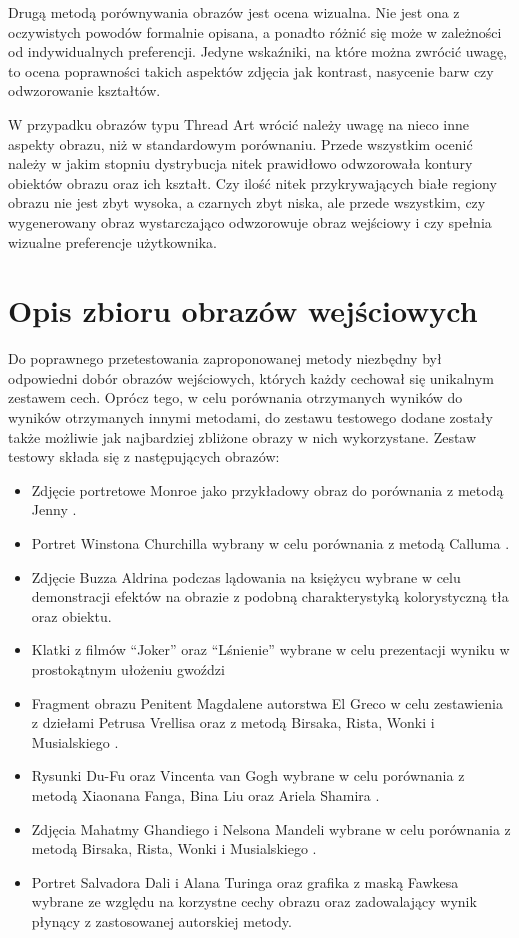     Drugą metodą porównywania obrazów jest ocena wizualna. Nie jest ona z oczywistych powodów formalnie opisana, a ponadto różnić się może w zależności od indywidualnych preferencji. Jedyne wskaźniki, na które można zwrócić uwagę, to ocena poprawności takich aspektów zdjęcia jak kontrast, nasycenie barw czy odwzorowanie kształtów.
    
    W przypadku obrazów typu Thread Art wrócić należy uwagę na nieco inne aspekty obrazu, niż w standardowym porównaniu. Przede wszystkim ocenić należy w jakim stopniu dystrybucja nitek prawidłowo odwzorowała kontury obiektów obrazu oraz ich kształt. Czy ilość nitek przykrywających białe regiony obrazu nie jest zbyt wysoka, a czarnych zbyt niska, ale przede wszystkim, czy wygenerowany obraz wystarczająco odwzorowuje obraz wejściowy i czy spełnia wizualne preferencje użytkownika.
    
    \section{Opis zbioru obrazów wejściowych} \label{comp-dataset}
    Do poprawnego przetestowania zaproponowanej metody niezbędny był odpowiedni dobór obrazów wejściowych, których każdy cechował się unikalnym zestawem cech. Oprócz tego, w celu porównania otrzymanych wyników do wyników otrzymanych innymi metodami, do zestawu testowego dodane zostały także możliwie jak najbardziej zbliżone obrazy w nich wykorzystane. Zestaw testowy składa się z następujących obrazów:
    \begin{itemize}
        \item Zdjęcie portretowe Monroe jako przykładowy obraz do porównania z metodą Jenny \cite{jenny-github}.
        \item Portret Winstona Churchilla wybrany w celu porównania z metodą Calluma \cite{callum-github}.
        \item Zdjęcie Buzza Aldrina podczas lądowania na księżycu wybrane w celu demonstracji efektów na obrazie z podobną charakterystyką kolorystyczną tła oraz obiektu.
        \item Klatki z filmów ``Joker'' oraz ``Lśnienie'' wybrane w celu prezentacji wyniku w prostokątnym ułożeniu gwoździ
        \item Fragment obrazu Penitent Magdalene autorstwa El Greco w celu zestawienia z dziełami Petrusa Vrellisa \cite{new-way-to-knit} oraz z metodą Birsaka, Rista, Wonki i Musialskiego \cite{article-string-art-birsak}.
        \item Rysunki Du-Fu oraz Vincenta van Gogh wybrane w celu porównania z metodą Xiaonana Fanga, Bina Liu oraz Ariela Shamira \cite{article-string-art-xiaonan}.
        \item Zdjęcia Mahatmy Ghandiego i Nelsona Mandeli wybrane w celu porównania z metodą Birsaka, Rista, Wonki i Musialskiego \cite{article-string-art-birsak}.
        \item Portret Salvadora Dali i Alana Turinga oraz grafika z maską Fawkesa wybrane ze względu na korzystne cechy obrazu oraz zadowalający wynik płynący z zastosowanej autorskiej metody.
    \end{itemize}

